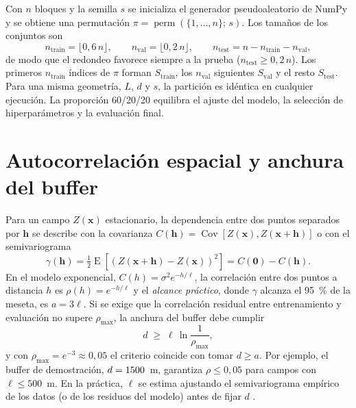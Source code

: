 \documentclass[11pt,a4paper]{article}
\newcommand{\vect}[1]{\mathbf{#1}}
\newcommand{\trainset}{S_{\mathrm{train}}}
\newcommand{\valset}{S_{\mathrm{val}}}
\newcommand{\testset}{S_{\mathrm{test}}}
\begin{document}
Con $n$ bloques y la semilla $s$ se inicializa el generador pseudoaleatorio de NumPy y se obtiene una
permutación $\pi = \operatorname{perm}(\{1,\dots,n\};\,s)$. Los tamaños de los conjuntos son
\begin{equation}
  n_{\mathrm{train}} = \lfloor 0{,}6\,n\rfloor,\qquad n_{\mathrm{val}} = \lfloor 0{,}2\,n\rfloor,\qquad
  n_{\mathrm{test}} = n - n_{\mathrm{train}} - n_{\mathrm{val}},
\end{equation}
de modo que el redondeo favorece siempre a la prueba ($n_{\mathrm{test}}\ge 0{,}2\,n$). Los primeros
$n_{\mathrm{train}}$ índices de $\pi$ forman $\trainset$, los $n_{\mathrm{val}}$ siguientes $\valset$ y el
resto $\testset$. Para una misma geometría, $L$, $d$ y $s$, la partición es idéntica en cualquier
ejecución. La proporción 60/20/20 equilibra el ajuste del modelo, la selección de hiperparámetros y la
evaluación final.

\section{Autocorrelación espacial y anchura del buffer}

Para un campo $Z(\vect x)$ estacionario, la dependencia entre dos puntos separados por $\vect h$ se
describe con la covarianza $C(\vect h) = \operatorname{Cov}[Z(\vect x), Z(\vect x+\vect h)]$ o con el
semivariograma \cite{matheron1963,cressie1993}
\begin{equation}
  \gamma(\vect h) = \tfrac12\operatorname{E}\!\left[(Z(\vect x+\vect h)-Z(\vect x))^2\right] = C(\vect 0) - C(\vect h).
\end{equation}
En el modelo exponencial, $C(h) = \sigma^2 e^{-h/\ell}$, la correlación entre dos puntos a distancia $h$
es $\rho(h) = e^{-h/\ell}$ y el \emph{alcance práctico}, donde $\gamma$ alcanza el 95~\% de la meseta,
es $a = 3\ell$. Si se exige que la correlación residual entre entrenamiento y evaluación no supere
$\rho_{\max}$, la anchura del buffer debe cumplir
\begin{equation}\label{eq:buffer}
  d \;\ge\; \ell\,\ln\frac{1}{\rho_{\max}},
\end{equation}
y con $\rho_{\max} = e^{-3}\approx 0{,}05$ el criterio coincide con tomar $d\ge a$. Por ejemplo, el
buffer de demostración, $d = 1500$~m, garantiza $\rho\le 0{,}05$ para campos con
$\ell\le 500$~m. En la práctica, $\ell$ se estima ajustando el semivariograma empírico de los datos (o
de los residuos del modelo) antes de fijar $d$ \cite{roberts2017,valavi2019}.
\end{document}
